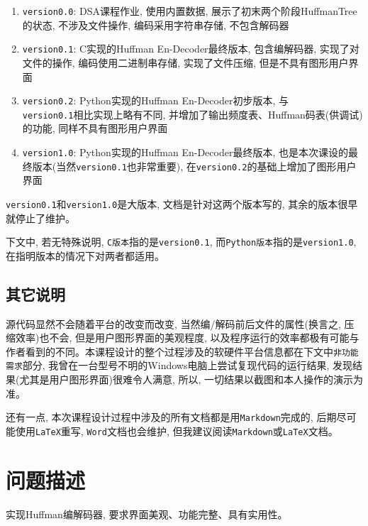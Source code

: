 \documentclass[a4paper]{ctexart}
\begin{document}
\begin{enumerate}
\def\labelenumi{\arabic{enumi}.}
\item
  \texttt{version0.0}: DSA课程作业, 使用内置数据, 展示了初末两个阶段HuffmanTree的状态, 不涉及文件操作, 编码采用字符串存储, 不包含解码器
\item
  \texttt{version0.1}: C实现的Huffman En-Decoder最终版本, 包含编解码器, 实现了对文件的操作, 编码使用二进制串存储, 实现了文件压缩, 但是不具有图形用户界面
\item
  \texttt{version0.2}: Python实现的Huffman En-Decoder初步版本, 与\\\texttt{version0.1}相比实现上略有不同, 并增加了输出频度表、Huffman码表(供调试)的功能, 同样不具有图形用户界面
\item
  \texttt{version1.0}: Python实现的Huffman En-Decoder最终版本, 也是本次课设的最终版本(当然\texttt{version0.1}也非常重要), 在\texttt{version0.2}的基础上增加了图形用户界面
\end{enumerate}

\texttt{version0.1}和\texttt{version1.0}是大版本, 文档是针对这两个版本写的, 其余的版本很早就停止了维护。

下文中, 若无特殊说明, \texttt{C版本}指的是\texttt{version0.1}, 而\texttt{Python版本}指的是\texttt{version1.0}, 在指明版本的情况下对两者都适用。

\subsection{其它说明}\label{header-n26}

源代码显然不会随着平台的改变而改变, 当然编/解码前后文件的属性(换言之, 压缩效率)也不会, 但是用户图形界面的美观程度, 以及程序运行的效率都极有可能与作者看到的不同。本课程设计的整个过程涉及的软硬件平台信息都在下文中\texttt{非功能需求}部分, 我曾在一台型号不明的Windows电脑上尝试复现代码的运行结果,
发现结果(尤其是用户图形界面)很难令人满意, 所以, 一切结果以截图和本人操作的演示为准。

还有一点, 本次课程设计过程中涉及的所有文档都是用\texttt{Markdown}完成的, 后期尽可能使用\texttt{LaTeX}重写, \texttt{Word}文档也会维护, 但我建议阅读\texttt{Markdown}或\texttt{LaTeX}文档。


\section{问题描述}\label{header-n29}

实现Huffman编解码器, 要求界面美观、功能完整、具有实用性。
\end{document}
